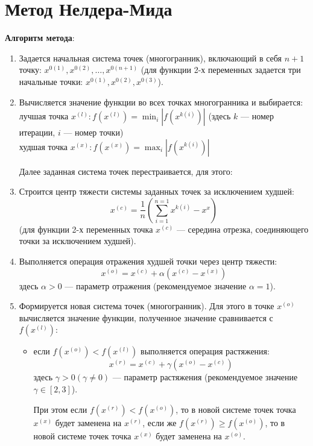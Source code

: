 \section{Метод Нелдера-Мида}

\textbf{Алгоритм метода}:
\begin{enumerate}

\item Задается начальная система точек (многогранник), включающий в себя $n + 1$ точку: $x^{0(1)}, x^{0(2)}, \ldots, x^{0(n+1)} $ (для функции 2-х переменных задается три начальные точки: $x^{0(1)}, x^{0(2)}, x^{0(3)} $).
\item Вычисляется значение функции во всех точках многогранника и выбирается:\\
лучшая точка $x^{(l)}: f(x^{(l)}) = \min_{i}|f(x^{k(i)})|$ (здесь $k$ --- номер итерации, $i$ --- номер точки)\\
худшая точка $x^{(x)}: f(x^{(x)}) = \max_{i}|f(x^{k(i)})|$

Далее заданная система точек перестраивается, для этого:

\item Строится центр тяжести системы заданных точек за исключением худшей:
$$ x^{(c)} = \dfrac{1}{n} \left( \sum_{i=1}^{n = 1} x^{k(i)} - x^{x} \right)$$
(для функции 2-х переменных точка $x^{(c)}$ --- середина отрезка, соединяющего точки за исключением худшей).

\item Выполняется операция отражения худшей точки через центр тяжести:
$$ x^{(o)} = x^{(c)} + \alpha (x^{(c)} - x^{(x)})$$
здесь $\alpha > 0$ --- параметр отражения (рекомендуемое значение $\alpha = 1$).

\item Формируется новая система точек (многогранник). Для этого в точке $x^{(o)}$ вычисляется значение функции, полученное значение сравнивается с $f(x^{(l)})$:

\begin{itemize}
\item если $f(x^{(o)}) < f(x^{(l)})$ выполняется операция растяжения:
$$ x^{(r)} = x^{(c)} + \gamma (x^{(o)} - x^{(c)})$$
здесь $\gamma > 0 (\gamma \neq 0)$ --- параметр растяжения (рекомендуемое значение $\gamma \in [2, 3]$).

При этом если $f(x^{(r)}) < f(x^{(o)})$, то в новой системе точек точка $x^{(x)}$ будет заменена на $x^{(r)}$, если же $f(x^{(r)}) \geq f(x^{(o)})$, то в новой системе точек точка $x^{(x)}$ будет заменена на $x^{(o)}$.


\end{itemize}
\end{enumerate}

